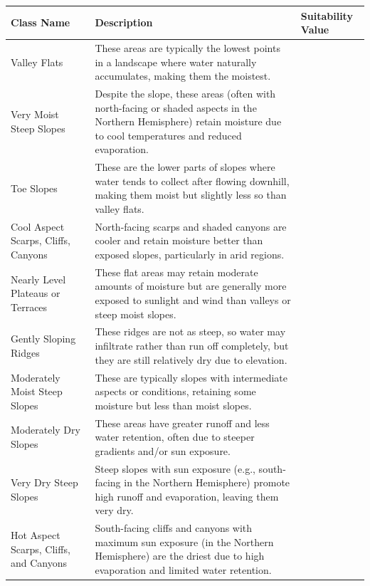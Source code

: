 \documentclass[
]{agujournal2019}
\begin{document}
\begin{longtable}[]{@{}
  >{\raggedright\arraybackslash}p{}
  >{\raggedright\arraybackslash}p{}
  >{\raggedright\arraybackslash}p{}@{}}
\toprule\noalign{}
\begin{minipage}[b]{\linewidth}\raggedright
Class Name
\end{minipage} & \begin{minipage}[b]{\linewidth}\raggedright
Description
\end{minipage} & \begin{minipage}[b]{\linewidth}\raggedright
Suitability Value
\end{minipage} \\
\midrule\noalign{}
\endhead
\bottomrule\noalign{}
\endlastfoot
Valley Flats & These areas are typically the lowest points in a
landscape where water naturally accumulates, making them the moistest. &
10 \\
Very Moist Steep Slopes & Despite the slope, these areas (often with
north-facing or shaded aspects in the Northern Hemisphere) retain
moisture due to cool temperatures and reduced evaporation. & 9 \\
Toe Slopes & These are the lower parts of slopes where water tends to
collect after flowing downhill, making them moist but slightly less so
than valley flats. & 8 \\
Cool Aspect Scarps, Cliffs, Canyons & North-facing scarps and shaded
canyons are cooler and retain moisture better than exposed slopes,
particularly in arid regions. & 7 \\
Nearly Level Plateaus or Terraces & These flat areas may retain moderate
amounts of moisture but are generally more exposed to sunlight and wind
than valleys or steep moist slopes. & 6 \\
Gently Sloping Ridges & These ridges are not as steep, so water may
infiltrate rather than run off completely, but they are still relatively
dry due to elevation. & 5 \\
Moderately Moist Steep Slopes & These are typically slopes with
intermediate aspects or conditions, retaining some moisture but less
than moist slopes. & 4 \\
Moderately Dry Slopes & These areas have greater runoff and less water
retention, often due to steeper gradients and/or sun exposure. & 3 \\
Very Dry Steep Slopes & Steep slopes with sun exposure (e.g.,
south-facing in the Northern Hemisphere) promote high runoff and
evaporation, leaving them very dry. & 2 \\
Hot Aspect Scarps, Cliffs, and Canyons & South-facing cliffs and canyons
with maximum sun exposure (in the Northern Hemisphere) are the driest
due to high evaporation and limited water retention. & 1 \\
\end{longtable}
\end{document}

